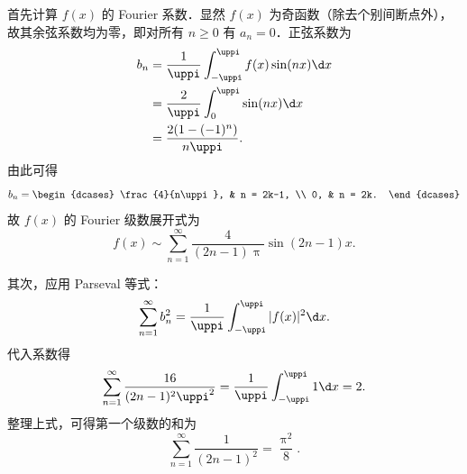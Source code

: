 \begin{solution}
    首先计算 $f(x)$ 的 Fourier 系数．显然 $f(x)$ 为奇函数（除去个别间断点外），故其余弦系数均为零，即对所有 $n \geqslant 0$ 有 $a_n = 0$．正弦系数为
    \begin{equation}\label{eq:fourier-coeff-3}
        \begin{aligned}
            b_n & = \frac{1}{\uppi} \int_{-\uppi}^{\uppi} f(x) \sin(nx) \d x \\
                & = \frac{2}{\uppi} \int_{0}^{\uppi} \sin(nx) \d x           \\
                & = \frac{2(1 - (-1)^n)}{n\uppi}.
        \end{aligned}
    \end{equation}
    由此可得
    \begin{equation}\label{eq:bn-cases-3}
        b_n = \begin{dcases} \frac{4}{n\uppi}, & n = 2k-1, \\ 0, & n = 2k. \end{dcases}
    \end{equation}
    故 $f(x)$ 的 Fourier 级数展开式为
    \begin{equation}
        \boxed{f(x) \sim \sum_{n=1}^{\infty} \frac{4}{(2n-1)\uppi} \sin(2n-1)x}.
    \end{equation}

    其次，应用 Parseval 等式：
    \begin{equation}\label{eq:parseval-3}
        \sum_{n=1}^{\infty} b_n^2 = \frac{1}{\uppi} \int_{-\uppi}^{\uppi} |f(x)|^2 \d x.
    \end{equation}
    代入系数得
    \begin{equation}\label{eq:parseval-calc-3}
        \sum_{n=1}^{\infty} \frac{16}{(2n-1)^2\uppi^2} = \frac{1}{\uppi} \int_{-\uppi}^{\uppi} 1 \d x = 2.
    \end{equation}
    整理上式，可得第一个级数的和为
    \begin{equation}
        \boxed{\sum_{n=1}^{\infty} \frac{1}{(2n-1)^2} = \frac{\uppi^2}{8}}.
    \end{equation}


\end{solution}
